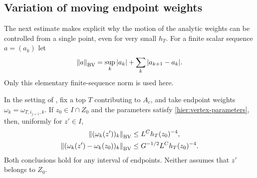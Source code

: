 \subsection{Variation of moving endpoint weights}

The next estimate makes explicit why the motion of the analytic weights
can be controlled from a single point, even for very small $h_T$.
For a finite scalar sequence $a=(a_k)$ let
\[
 \left\|a\right\|_{\mathrm{BV}}
 =\sup_k|a_k|+\sum_k|a_{k+1}-a_k|.
\]
Only this elementary finite-sequence norm is used here.

\begin{lemma}
\label{hier:moving-weights}
In the setting of , fix a top $T$ contributing to
$A_c$, and take endpoint weights $\omega_k=\omega_{T,i_{j+1},k}$.
If $z_0\in I\cap Z_0$ and the parameters satisfy
\eqref{hier:vertex-parameters}, then, uniformly for $z'\in I$,
\begin{align}
 \left\|(\omega_k(z'))_k\right\|_{\mathrm{BV}}
 &\le L^C h_T(z_0)^{-4},
 \label{hier:moving-weight-bv}\\
 \left\|(\omega_k(z')-\omega_k(z_0))_k\right\|_{\mathrm{BV}}
 &\le G^{-1/2}L^C h_T(z_0)^{-4}.
 \label{hier:moving-weight-difference}
\end{align}
Both conclusions hold for any interval of endpoints.  Neither assumes
that $z'$ belongs to $Z_0$.
\end{lemma}

